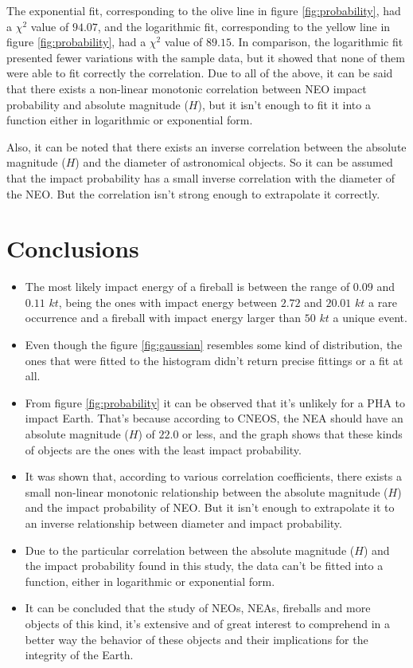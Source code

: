 \documentclass[
	a4paper, %
	10pt, %
	unnumberedsections, %
	twoside, %
]{LTJournalArticle}
\begin{document}
The exponential fit, corresponding to the olive line in figure \ref{fig:probability}, had a $\chi^2$
value of $94.07$, and the logarithmic fit, corresponding to the yellow line in figure \ref{fig:probability},
had a $\chi^2$ value of $89.15$. In comparison, the logarithmic fit presented fewer variations with the
sample data, but it showed that none of them were able to fit correctly the correlation. Due to all of
the above, it can be said that there exists a non-linear monotonic correlation between NEO impact
probability and absolute magnitude ($H$), but it isn't enough to fit it into a function either in
logarithmic or exponential form.

Also, it can be noted that there exists an inverse correlation between the absolute magnitude ($H$) and
the diameter of astronomical objects. So it can be assumed that the impact probability has a small inverse
correlation with the diameter of the NEO. But the correlation isn't strong enough to extrapolate it
correctly.


\section{Conclusions}

\begin{itemize}
	\item The most likely impact energy of a fireball is between the range of $0.09$ and $0.11$ $kt$,
	being the ones with impact energy between $2.72$ and $20.01$ $kt$ a rare occurrence and
	a fireball with impact energy larger than $50$ $kt$ a unique event.
	\item Even though the figure \ref{fig:gaussian} resembles some kind of distribution, the ones that
	were fitted to the histogram didn't return precise fittings or a fit at all.
	\item From figure \ref{fig:probability} it can be observed that it's unlikely for a PHA to impact
	Earth. That's because according to CNEOS, the NEA should have an absolute magnitude ($H$) of $22.0$
	or less, and the graph shows that these kinds of objects are the ones with the least impact probability.
	\item It was shown that, according to various correlation coefficients, there exists a small non-linear
	monotonic relationship between the absolute magnitude ($H$) and the impact probability of NEO. But
	it isn't enough to extrapolate it to an inverse relationship between diameter and impact probability.
	\item Due to the particular correlation between the absolute magnitude ($H$) and the impact probability
	found in this study, the data can't be fitted into a function, either in logarithmic or exponential form.
	\item It can be concluded that the study of NEOs, NEAs, fireballs and more objects of this kind, it's
	extensive and of great interest to comprehend in a better way the behavior of these objects and their
	implications for the integrity of the Earth.
\end{itemize}
\end{document}
